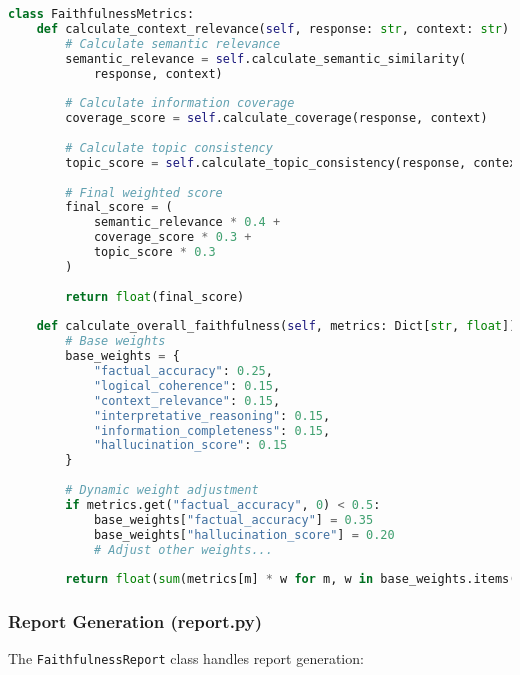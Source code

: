 \begin{lstlisting}[language=Python, breaklines=true, basicstyle=\ttfamily\footnotesize]
class FaithfulnessMetrics:
    def calculate_context_relevance(self, response: str, context: str) -> float:
        # Calculate semantic relevance
        semantic_relevance = self.calculate_semantic_similarity(
            response, context)
        
        # Calculate information coverage
        coverage_score = self.calculate_coverage(response, context)
        
        # Calculate topic consistency
        topic_score = self.calculate_topic_consistency(response, context)
        
        # Final weighted score
        final_score = (
            semantic_relevance * 0.4 +
            coverage_score * 0.3 +
            topic_score * 0.3
        )
        
        return float(final_score)
        
    def calculate_overall_faithfulness(self, metrics: Dict[str, float]) -> float:
        # Base weights
        base_weights = {
            "factual_accuracy": 0.25,
            "logical_coherence": 0.15,
            "context_relevance": 0.15,
            "interpretative_reasoning": 0.15,
            "information_completeness": 0.15,
            "hallucination_score": 0.15
        }
        
        # Dynamic weight adjustment
        if metrics.get("factual_accuracy", 0) < 0.5:
            base_weights["factual_accuracy"] = 0.35
            base_weights["hallucination_score"] = 0.20
            # Adjust other weights...
        
        return float(sum(metrics[m] * w for m, w in base_weights.items()))
\end{lstlisting}

\subsubsection{Report Generation (report.py)}
The \texttt{FaithfulnessReport} class handles report generation:

